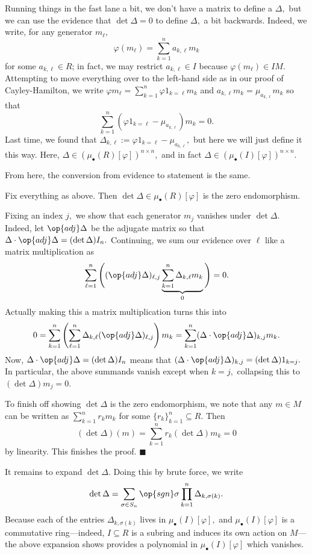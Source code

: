 Running things in the fast lane a bit, we don't have a matrix to define a $\Delta,$ but we can use the evidence that $\det\Delta=0$ to define $\Delta,$ a bit backwards. Indeed, we write, for any generator $m_\ell,$
\[\varphi(m_\ell)=\sum_{k=1}^na_{k,\ell}m_k\]
for some $a_{k,\ell}\in R$; in fact, we may restrict $a_{k,\ell}\in I$ because $\varphi(m_\ell)\in IM.$ Attempting to move everything over to the left-hand side as in our proof of Cayley-Hamilton, we write $\varphi m_\ell=\sum_{k=1}^n\varphi1_{k=\ell}m_k$ and $a_{k,\ell}m_k=\mu_{a_{k,\ell}}m_k$ so that
\[\sum_{k=1}^n\left(\varphi1_{k=\ell}-\mu_{a_{k,\ell}}\right)m_k=0.\]
Last time, we found that $\Delta_{k,\ell}:=\varphi1_{k=\ell}-\mu_{a_{k,\ell}},$ but here we will just define it this way. Here, $\Delta\in(\mu_\bullet(R)[\varphi])^{n\times n},$ and in fact $\Delta\in(\mu_\bullet(I)[\varphi])^{n\times n}.$

From here, the conversion from evidence to statement is the same.
\begin{lemma}
    Fix everything as above. Then $\det\Delta\in\mu_\bullet(R)[\varphi]$ is the zero endomorphism.
\end{lemma}
Fixing an index $j,$ we show that each generator $m_j$ vanishes under $\det\Delta.$ Indeed, let $\op{adj}\Delta$ be the adjugate matrix so that $\Delta\cdot\op{adj}\Delta=(\det\Delta)I_n.$ Continuing, we sum our evidence over $\ell$ like a matrix multiplication as
\[\sum_{\ell=1}^n\Bigg((\op{adj}\Delta)_{\ell,j}\underbrace{\sum_{k=1}^n\Delta_{k,\ell}m_k}_0\Bigg)=0.\]
Actually making this a matrix multiplication turns this into
\[0=\sum_{k=1}^n\left(\sum_{\ell=1}^n\Delta_{k,\ell}(\op{adj}\Delta)_{\ell,j}\right)m_k=\sum_{k=1}^n(\Delta\cdot\op{adj}\Delta)_{k,j}m_k.\]
Now, $\Delta\cdot\op{adj}\Delta=(\det\Delta)I_n$ means that $(\Delta\cdot\op{adj}\Delta)_{k,j}=(\det\Delta)1_{k=j}.$ In particular, the above summands vanish except when $k=j,$ collapsing this to $(\det\Delta)m_j=0.$

To finish off showing $\det\Delta$ is the zero endomorphism, we note that any $m\in M$ can be written as $\sum_{k=1}^nr_km_k$ for some $\{r_k\}_{k=1}^n\subseteq R.$ Then
\[(\det\Delta)(m)=\sum_{k=1}^nr_k(\det\Delta)m_k=0\]
by linearity. This finishes the proof. $\blacksquare$

It remains to expand $\det\Delta.$ Doing this by brute force, we write
\[\det\Delta=\sum_{\sigma\in S_n}\op{sgn}\sigma\prod_{k=1}^n\Delta_{k,\sigma(k)}.\]
Because each of the entries $\Delta_{k,\sigma(k)}$ lives in $\mu_\bullet(I)[\varphi],$ and $\mu_\bullet(I)[\varphi]$ is a commutative ring---indeed, $I\subseteq R$ is a subring and induces its own action on $M$---the above expansion shows provides a polynomial in $\mu_\bullet(I)[\varphi]$ which vanishes.

